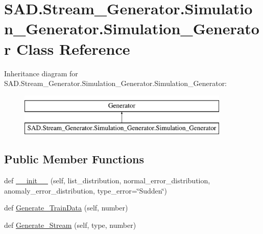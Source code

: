 \hypertarget{classSAD_1_1Stream__Generator_1_1Simulation__Generator_1_1Simulation__Generator}{}\section{S\+A\+D.\+Stream\+\_\+\+Generator.\+Simulation\+\_\+\+Generator.\+Simulation\+\_\+\+Generator Class Reference}
\label{classSAD_1_1Stream__Generator_1_1Simulation__Generator_1_1Simulation__Generator}
Inheritance diagram for S\+A\+D.\+Stream\+\_\+\+Generator.\+Simulation\+\_\+\+Generator.\+Simulation\+\_\+\+Generator\+:\begin{figure}[H]
\begin{center}
\leavevmode
\includegraphics[height=2.000000cm]{classSAD_1_1Stream__Generator_1_1Simulation__Generator_1_1Simulation__Generator}
\end{center}
\end{figure}
\subsection*{Public Member Functions}
\begin{DoxyCompactItemize}
\item 
def \hyperlink{classSAD_1_1Stream__Generator_1_1Simulation__Generator_1_1Simulation__Generator_a2103b42b5bcb5cf441e74de526695f86}{\+\_\+\+\_\+init\+\_\+\+\_\+} (self, list\+\_\+distribution, normal\+\_\+error\+\_\+distribution, anomaly\+\_\+error\+\_\+distribution, type\+\_\+error=\char`\"{}Sudden\char`\"{})
\item 
def \hyperlink{classSAD_1_1Stream__Generator_1_1Simulation__Generator_1_1Simulation__Generator_a0ca784a29449c50c31db5a171ea3c378}{Generate\+\_\+\+Train\+Data} (self, number)
\item 
def \hyperlink{classSAD_1_1Stream__Generator_1_1Simulation__Generator_1_1Simulation__Generator_ab3812dceb7cec4fdac22dae14f72b793}{Generate\+\_\+\+Stream} (self, type, number)
\end{DoxyCompactItemize}
